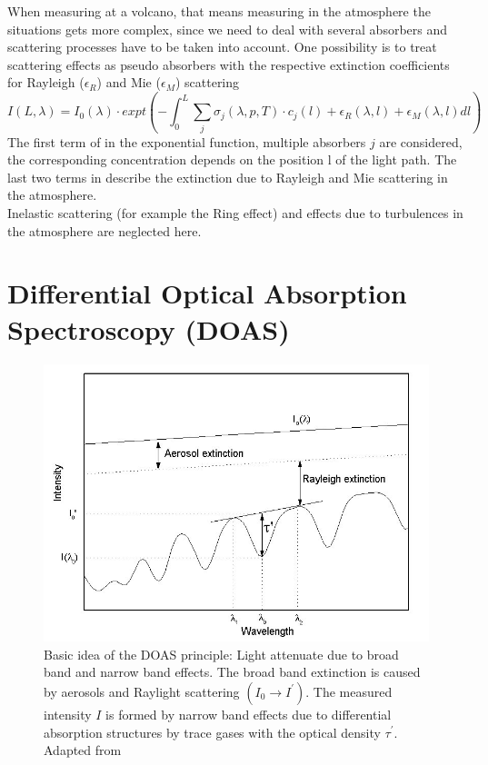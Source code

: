 \documentclass  [
  paper    = a4,
  BCOR     = 10mm,
  twoside,
  fontsize = 12pt,
  fleqn,
  toc      = bibnumbered,
  toc      = listofnumbered,
  numbers  = noendperiod,
  headings = normal,
  listof   = leveldown,
  version  = 3.03
]                                       {scrreprt}
\begin{document}
	When measuring at a volcano, that means measuring in the atmosphere the situations gets more complex, since we need to deal with several absorbers and scattering processes have to be taken into account. One possibility is to treat scattering effects as pseudo absorbers with the respective extinction coefficients for Rayleigh ($\epsilon_R$) and  Mie ($\epsilon_M$) scattering
	\begin{equation}
	I\left(L,\lambda\right) = I_{0}\left(\lambda\right)\cdot expt\left(-\int^{L}_{0}\sum_{j}\sigma_{j}\left(\lambda,p,T\right)\cdot
	c_{j}\left(l\right)+\epsilon_R\left(\lambda,l\right)+\epsilon_{M}\left(\lambda,l\right)dl\right)
	\label{eq:lbe}
	\end{equation}
	The first term of  in the exponential function, multiple absorbers $j$ are considered, the corresponding concentration depends on the position l of the light path.
	The last two terms in describe the extinction due to Rayleigh and Mie scattering in the atmosphere.\\
	Inelastic scattering (for example the Ring effect) and effects due to turbulences in the atmosphere are neglected here.

	\section{Differential Optical Absorption Spectroscopy (DOAS)\label{DOAS}}
		\begin{figure}
			\centering
			\includegraphics[width=0.8\linewidth]{Bilder/Simon/Bilder_Tung/DOAS_Intensity}
			\caption{Basic idea of the DOAS principle: Light attenuate due to broad band and narrow band effects. The broad band extinction is caused by aerosols and Raylight scattering $\left(I_0\rightarrow I^{'}\right)$. The measured intensity $I$ is formed by narrow band effects due to differential absorption structures by trace gases with the optical density $\tau^{'}$. Adapted from \cite{kern2009spectroscopic}}
			\label{fig:doasintensity}
		\end{figure}
		
\end{document}
